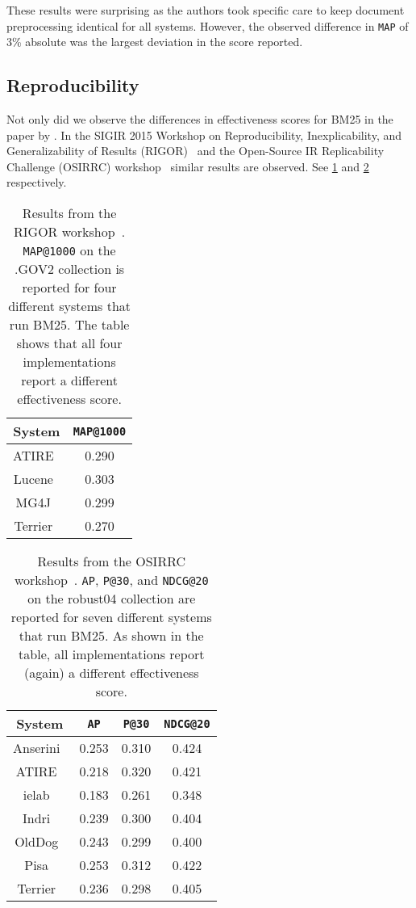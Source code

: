 These results were surprising as the authors took specific care to keep document preprocessing identical for all systems. However, the observed difference in \texttt{MAP} of 3\% absolute was the largest deviation in the score reported.

\subsection{Reproducibility}
Not only did we observe the differences in effectiveness scores for BM25 in the paper by \citet{OldDog}. In the SIGIR 2015 Workshop on Reproducibility, Inexplicability, and Generalizability of Results (RIGOR)~\citep{RIGOR} and the Open-Source IR Replicability Challenge (OSIRRC) workshop~\citep{OSIRRC} similar results are observed. See \cref{rigor_results} and \cref{osirrc_results} respectively.  

\begin{table}
	\centering
	\caption{Results from the RIGOR workshop~\citep{RIGOR}. \texttt{MAP@1000} on the .GOV2 collection is reported for four different systems that run BM25. The table shows that all four implementations report a different effectiveness score.}
	\label{rigor_results}
	\begin{tabular}{c c}
		\toprule
		System &  \texttt{MAP@1000} \\
		\midrule
		ATIRE~\citep{ATIRE} & 0.290 \\
		Lucene~\citep{lucene} & 0.303 \\
		MG4J~\citep{MG4J} & 0.299 \\
		Terrier~\citep{terrier} & 0.270 \\
		\bottomrule
	\end{tabular}
\end{table}

\begin{table}
	\centering
	\caption{Results from the OSIRRC workshop~\citep{OSIRRC}. \texttt{AP}, \texttt{P@30}, and \texttt{NDCG@20} on the robust04 collection are reported for seven different systems that run BM25. As shown in the table, all implementations report (again) a different effectiveness score.}
	\label{osirrc_results}
	\begin{tabular}{c c c c}
		\toprule
		System & \texttt{AP} & \texttt{P@30} & \texttt{NDCG@20} \\
		\midrule
		Anserini~\citep{anserini-docker} & 0.253 & 0.310 & 0.424 \\
		ATIRE~\citep{ATIRE} & 0.218 & 0.320 & 0.421 \\
		ielab~\citep{ielab} & 0.183 & 0.261 & 0.348 \\
		Indri~\citep{indri-docker} & 0.239 & 0.300 & 0.404 \\
		OldDog~\citep{olddog-docker} & 0.243 & 0.299 & 0.400 \\
		Pisa~\cite{pisa} & 0.253 & 0.312 & 0.422 \\
		Terrier~\citep{terrier-docker} & 0.236 & 0.298 & 0.405 \\
		\bottomrule
	\end{tabular}
\end{table}

